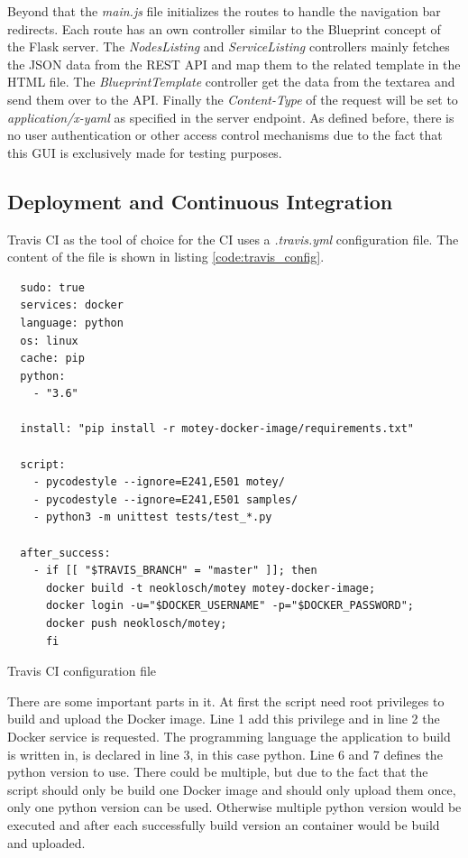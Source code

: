 Beyond that the \textit{main.js} file initializes the routes to handle the navigation bar redirects.
Each route has an own controller similar to the Blueprint concept of the Flask server.
The \textit{NodesListing} and \textit{ServiceListing} controllers mainly fetches the \ac{JSON} data from the \ac{REST} \ac{API} and map them to the related template in the \ac{HTML} file.
The \textit{BlueprintTemplate} controller get the data from the textarea and send them over to the \ac{API}.
Finally the \textit{Content-Type} of the request will be set to \textit{application/x-yaml} as specified in the server endpoint.
As defined before, there is no user authentication or other access control mechanisms due to the fact that this \ac{GUI} is exclusively made for testing purposes.

\subsection{Deployment and Continuous Integration}
Travis CI as the tool of choice for the \ac{CI} uses a \textit{.travis.yml} configuration file.
The content of the file is shown in listing \ref{code:travis_config}.

\begin{listing}[H]
  \begin{verbatim}
  sudo: true
  services: docker
  language: python
  os: linux
  cache: pip
  python:
    - "3.6"

  install: "pip install -r motey-docker-image/requirements.txt"

  script:
    - pycodestyle --ignore=E241,E501 motey/
    - pycodestyle --ignore=E241,E501 samples/
    - python3 -m unittest tests/test_*.py

  after_success:
    - if [[ "$TRAVIS_BRANCH" = "master" ]]; then
      docker build -t neoklosch/motey motey-docker-image;
      docker login -u="$DOCKER_USERNAME" -p="$DOCKER_PASSWORD";
      docker push neoklosch/motey;
      fi
  \end{verbatim}
  \caption{Travis CI configuration file}
  \label{code:travis_config}
\end{listing}

There are some important parts in it.
At first the script need root privileges to build and upload the Docker image.
Line 1 add this privilege and in line 2 the Docker service is requested.
The programming language the application to build is written in, is declared in line 3, in this case python.
Line 6 and 7 defines the python version to use.
There could be multiple, but due to the fact that the script should only be build one Docker image and should only upload them once, only one python version can be used.
Otherwise multiple python version would be executed and after each successfully build version an container would be build and uploaded.

